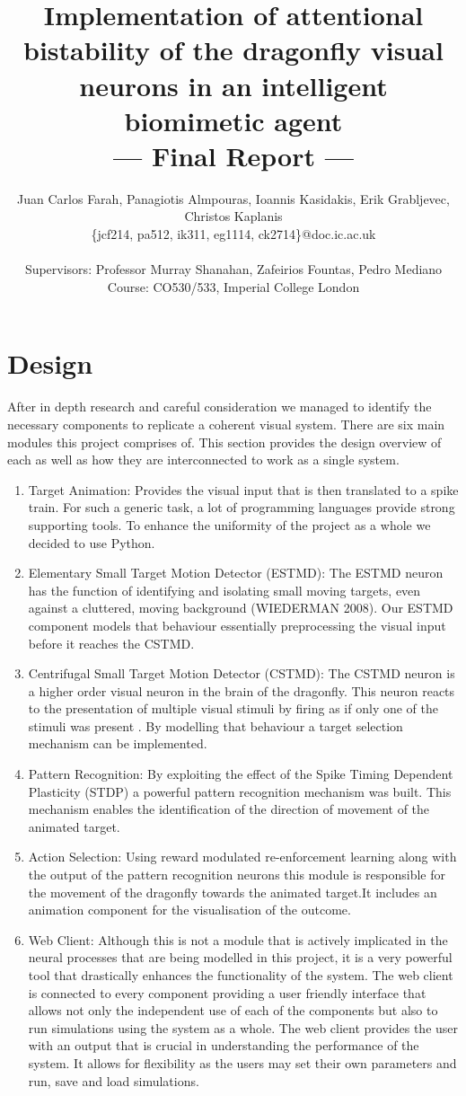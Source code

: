 \documentclass[a4paper,11pt]{article}
\title{Implementation of attentional bistability of the dragonfly visual neurons in an intelligent biomimetic agent\\\Large{--- Final Report ---}}
\author{Juan Carlos Farah, Panagiotis Almpouras, Ioannis Kasidakis, Erik Grabljevec, Christos Kaplanis\\
       \{jcf214, pa512, ik311, eg1114, ck2714\}@doc.ic.ac.uk\\ \\
       \small{Supervisors: Professor Murray Shanahan, Zafeirios Fountas, Pedro Mediano}\\
       \small{Course: CO530/533, Imperial College London}
}
\begin{document}
\maketitle

\section{Design}

After in depth research and careful consideration we managed to identify the necessary components to replicate a coherent visual system.
There are six main modules this project comprises of. This section provides the design overview of each as well as how they are interconnected to work as a single system.

\begin{enumerate}
\item{Target Animation:} Provides the visual input that is then translated to a spike train. For such a generic task, a lot of programming languages provide strong supporting tools. To enhance the uniformity of the project as a whole we decided to use Python.\cite{python}
\item{Elementary Small Target Motion Detector (ESTMD):} The ESTMD neuron has the function of identifying and isolating small moving targets, even against a cluttered, moving background (WIEDERMAN 2008). Our ESTMD component models that behaviour essentially preprocessing the visual input before it reaches the CSTMD.
\item{Centrifugal Small Target Motion Detector (CSTMD):} The CSTMD neuron is a higher order visual neuron in the brain of the dragonfly. This neuron reacts to the presentation of multiple visual stimuli by firing as if only one of the stimuli was present \cite{w13}. By modelling that behaviour a target selection mechanism can be implemented.
\item{Pattern Recognition:} By exploiting the effect of the Spike Timing Dependent Plasticity (STDP) a powerful pattern recognition mechanism was built\cite{stdp1}\cite{stdp2}. This mechanism enables the identification of the direction of movement of the animated target.
\item{Action Selection:} Using reward modulated re-enforcement learning along with the output of the pattern recognition neurons this module is responsible for the movement of the dragonfly towards the animated target.It includes an animation component for the visualisation of the outcome.
\item{Web Client:} Although this is not a module that is actively implicated in the neural processes that are being modelled in this project, it is a very powerful tool that drastically enhances the functionality of the system. The web client is connected to every component providing a user friendly interface that allows not only the independent use of each of the components but also to run simulations using the system as a whole. The web client provides the user with an output that is crucial in understanding the performance of the system. It allows for flexibility as the users may set their own parameters and run, save and load simulations.
\end{enumerate}
\end{document}
